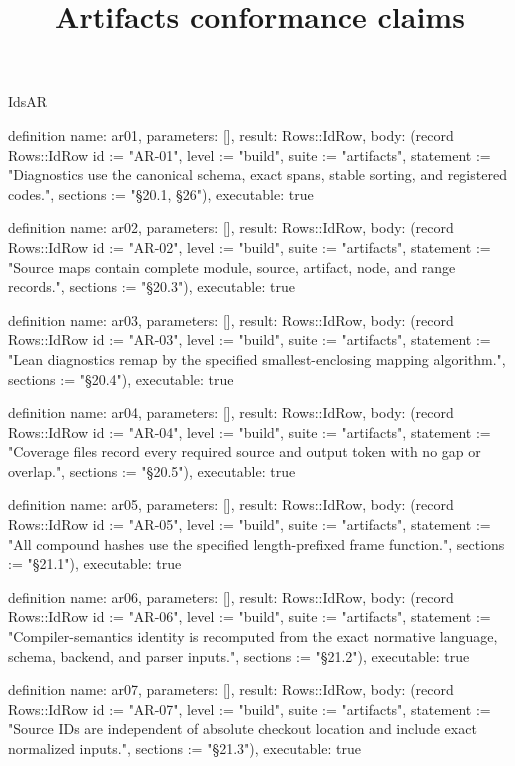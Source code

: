 \begin{lexlean}{IdsAR}
\title{Artifacts conformance claims}
\begin{semanticmodule}
definition{
  name: ar01,
  parameters: [],
  result: Rows::IdRow,
  body: (record Rows::IdRow {id := "AR-01", level := "build", suite := "artifacts", statement := "Diagnostics use the canonical schema, exact spans, stable sorting, and registered codes.", sections := "§20.1, §26"}),
  executable: true
}

definition{
  name: ar02,
  parameters: [],
  result: Rows::IdRow,
  body: (record Rows::IdRow {id := "AR-02", level := "build", suite := "artifacts", statement := "Source maps contain complete module, source, artifact, node, and range records.", sections := "§20.3"}),
  executable: true
}

definition{
  name: ar03,
  parameters: [],
  result: Rows::IdRow,
  body: (record Rows::IdRow {id := "AR-03", level := "build", suite := "artifacts", statement := "Lean diagnostics remap by the specified smallest-enclosing mapping algorithm.", sections := "§20.4"}),
  executable: true
}

definition{
  name: ar04,
  parameters: [],
  result: Rows::IdRow,
  body: (record Rows::IdRow {id := "AR-04", level := "build", suite := "artifacts", statement := "Coverage files record every required source and output token with no gap or overlap.", sections := "§20.5"}),
  executable: true
}

definition{
  name: ar05,
  parameters: [],
  result: Rows::IdRow,
  body: (record Rows::IdRow {id := "AR-05", level := "build", suite := "artifacts", statement := "All compound hashes use the specified length-prefixed frame function.", sections := "§21.1"}),
  executable: true
}

definition{
  name: ar06,
  parameters: [],
  result: Rows::IdRow,
  body: (record Rows::IdRow {id := "AR-06", level := "build", suite := "artifacts", statement := "Compiler-semantics identity is recomputed from the exact normative language, schema, backend, and parser inputs.", sections := "§21.2"}),
  executable: true
}

definition{
  name: ar07,
  parameters: [],
  result: Rows::IdRow,
  body: (record Rows::IdRow {id := "AR-07", level := "build", suite := "artifacts", statement := "Source IDs are independent of absolute checkout location and include exact normalized inputs.", sections := "§21.3"}),
  executable: true
}


\end{semanticmodule}
\end{lexlean}
